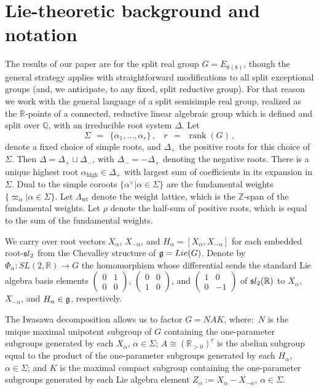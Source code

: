\documentclass[12pt]{article}
\numberwithin{equation}{section}
\renewcommand\a{\alpha}
\newcommand\D{\Delta}
\renewcommand\D{\Delta}
\newcommand{\Z}{{\mathbb{Z}}}
\newcommand{\R}{{\mathbb{R}}}
\newcommand{\Q}{{\mathbb{Q}}}
\renewcommand\({\left(}
\renewcommand\){\right)}
\newcommand{\ttwo}[4]{
\(\begin{smallmatrix}{#1} & {#2}
\\ {#3} & {#4} \end{smallmatrix}\)}
\begin{document}
\section{Lie-theoretic background and notation}\label{sec:background}


The results of our paper are for the split real group $G=E_{8(8)}$, though the general strategy applies with straightforward modifications to all split exceptional groups (and, we anticipate, to any fixed, split reductive group).  For that reason we work with the general language of a split semisimple real group, realized as the $\R$-points of a connected, reductive linear algebraic group which is defined and split over $\Q$, with an irreducible root system $\Delta$.  Let
\begin{equation}\label{Sigmadef}
  \Sigma \ \ = \ \ \{\alpha_1,\ldots,\alpha_r\}\,, \  \ \ \ r \ \ = \ \ \operatorname{rank}(G)\,,
\end{equation}
 denote a fixed choice of simple roots, and $\Delta_+$ the positive roots for this choice of $\Sigma$.  Then $\Delta=\Delta_+\sqcup \Delta_{-}$, with $\Delta_{-}=-\Delta_+$ denoting the negative roots.  There is a unique highest root $\alpha_{\text{high}}\in \D_+$ with largest sum of coefficients in its expansion in $\Sigma$.
Dual to the simple coroots $\{\alpha^\vee|\alpha\in\Sigma\}$ are the fundamental weights $\{\varpi_\alpha|\a\in\Sigma\}$.  Let $\Lambda_{\text{wt}}$ denote the weight lattice, which is the $\Z$-span of the fundamental weights.  Let $\rho$ denote the half-sum of positive roots, which is equal to the sum of the fundamental weights.

We carry over root vectors $X_{\a}$, $X_{-\a}$, and $H_\a=[X_\a,X_{-\a}]$ for each embedded root-${\frak sl}_2$ from the Chevalley structure of ${\frak g}=Lie(G)$.  Denote by $\Phi_\a:SL(2,\R)\rightarrow G$ the homomorphism whose differential sends the standard Lie algebra basis elements $\ttwo 0100$, $\ttwo 0010$, and $\ttwo{1}00{-1}$ of ${\frak sl}_2(\R)$ to $X_\a$, $X_{-\a}$, and $H_\a\in {\frak g}$, respectively.


The Iwasawa decomposition
allows us to factor $G=NAK$, where:~$N$ is the unique maximal unipotent subgroup of $G$ containing the one-parameter subgroups generated by each $X_\a$, $\a\in\Sigma$; $A\cong(\R_{>0})^r$ is the   abelian subgroup equal to the product of the one-parameter subgroups generated by each $H_\a$, $\a\in\Sigma$; and $K$ is the maximal compact subgroup containing  the one-parameter subgroups generated by each Lie algebra element $Z_\alpha:=X_{\alpha}-X_{-\alpha}$, $\alpha \in \Sigma$.
\end{document}
